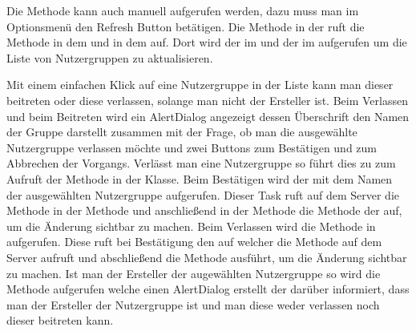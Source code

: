 Die  Methode kann auch manuell aufgerufen werden, dazu muss man im Optionsmenü den Refresh Button betätigen. Die  Methode in der  ruft die  Methode in dem  und in dem  auf. Dort wird der  im  und der  im  aufgerufen um die Liste von Nutzergruppen zu aktualisieren. 

\label{sec:nutzergruppeBeitretenVerlassen}
Mit einem einfachen Klick auf eine Nutzergruppe in der Liste kann man dieser beitreten oder diese verlassen, solange man nicht der Ersteller ist. Beim Verlassen und beim Beitreten wird ein AlertDialog angezeigt dessen Überschrift den Namen der Gruppe darstellt zusammen mit der Frage, ob man die ausgewählte Nutzergruppe verlassen möchte und zwei Buttons zum Bestätigen und zum Abbrechen der Vorgangs. Verlässt man eine Nutzergruppe so führt dies zu zum Aufruft der  Methode in der  Klasse. Beim Bestätigen wird der  mit dem Namen der ausgewählten Nutzergruppe aufgerufen. Dieser Task ruft auf dem Server die  Methode in der  Methode und anschließend in der  Methode die  Methode der  auf, um die Änderung sichtbar zu machen. Beim Verlassen wird die  Methode in  aufgerufen. Diese ruft bei Bestätigung den  auf welcher die  Methode auf dem Server aufruft und abschließend die  Methode ausführt, um die Änderung sichtbar zu machen. Ist man der Ersteller der augewählten Nutzergruppe so wird die  Methode aufgerufen welche einen AlertDialog erstellt der darüber informiert, dass man der Ersteller der Nutzergruppe ist und man diese weder verlassen noch dieser beitreten kann.


